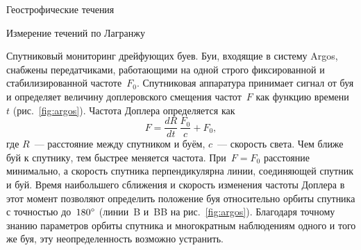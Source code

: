 \begin{chapter}{Геострофические течения}
\begin{section}{Измерение течений по Лагранжу}
\begin{paragraph}{Спутниковый мониторинг дрейфующих буев.}
Буи, входящие в систему Argos, снабжены передатчиками, работающими
на одной строго фиксированной и стабилизированной
частоте~$F_0$. Спутниковая аппаратура принимает сигнал от буя и
определяет величину доплеровского смещения частот~$F$ как функцию времени~$t$
(рис.~\ref{fig:argos}). Частота Доплера определяется как
\begin{displaymath}
 F=\frac{dR}{dt}\,\frac{F_0}{c} + F_0,
\end{displaymath}
где $R$~--- расстояние между спутником и буём, $c$~--- скорость
света. Чем ближе буй к спутнику, тем быстрее меняется частота.
При~$F=F_0$ расстояние минимально, а скорость спутника перпендикулярна
линии, соединяющей спутник и буй. Время наибольшего сближения и
скорость изменения частоты Доплера в этот момент позволяют
определить положение буя относительно орбиты спутника с точностью
до~${180}^\circ$ (линии~B и~BB на рис.~\ref{fig:argos}). 
Благодаря точному знанию параметров орбиты спутника и многократным наблюдениям
одного и того же буя, эту неопределенность возможно устранить.
%


\end{paragraph}
\end{section}
\end{chapter}
